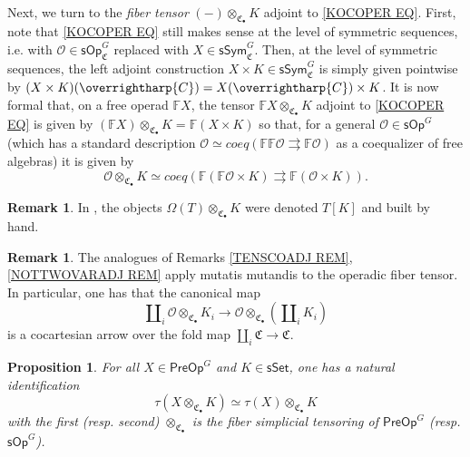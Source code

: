 \documentclass[a4paper,10pt
,draft
]{article}%
\numberwithin{equation}{section}
\numberwithin{figure}{section}
\newtheorem{proposition}[equation]{Proposition}%
\theoremstyle{definition} %
\newtheorem{remark}[equation]{Remark}%
\newcommand{\vect}[1]{\text{\overrightharp{\ensuremath{#1}}}}
\newcommand{\sSet}{\ensuremath{\mathsf{sSet}}}%
\newcommand{\sOp}{\ensuremath{\mathsf{sOp}}}%
\renewcommand{\O}{\ensuremath{\mathcal O}}
\newcommand{\1}{\ensuremath{\mathbbm 1}}%
\begin{document}
Next, we turn to the \emph{fiber tensor} 
$(-)\otimes_{\mathfrak{C}_{\bullet}} K$
adjoint to \eqref{KOCOPER EQ}.
First, note that 
\eqref{KOCOPER EQ}
still makes sense 
at the level of symmetric sequences, i.e. 
with 
$\O \in \mathsf{sOp}^G_{\mathfrak{C}}$
replaced with
$X \in \mathsf{sSym}^G_{\mathfrak{C}}$.
Then, at the level of symmetric sequences, the left adjoint construction
$X \times K \in \mathsf{sSym}^G_{\mathfrak{C}}$
is simply given pointwise by
$(X \times K)(\vect{C}) = X(\vect{C}) \times K$.
It is now formal that, 
on a free operad $\mathbb{F} X$,
the tensor $\mathbb{F} X \otimes_{\mathfrak{C}_{\bullet}} K$
adjoint to \eqref{KOCOPER EQ} is given by 
$(\mathbb{F} X) \otimes_{\mathfrak{C}_{\bullet}} K
= \mathbb{F} (X \times K)$
so that,
for a general $\O \in \mathsf{sOp}^G$
(which has a standard description
$\O \simeq coeq (\mathbb{F}\mathbb{F}\O \rightrightarrows \mathbb{F}\O)$
as a coequalizer of free algebras)
it is given by
\[
\mathcal{O} \otimes_{\mathfrak{C}_{\bullet}} K
\simeq
coeq 
\left(
\mathbb{F} (\mathbb{F} \O \times K) 
\rightrightarrows \mathbb{F} (\O \times K) 
\right).
\]
\begin{remark}\label{BYHAND2 REM}
	In \cite[\S 7.1]{CM13b}, 
	the objects $\Omega(T)  \otimes_{\mathfrak{C}_{\bullet}} K$
	were denoted $T[K]$ and built by hand.
\end{remark}


\begin{remark}
	The analogues of Remarks \ref{TENSCOADJ REM},
	\ref{NOTTWOVARADJ REM}
	apply mutatis mutandis to the operadic fiber tensor.
%	
	In particular, one has that the canonical map
\begin{equation}\label{COCARTAR EQ}
	\amalg_i \O \otimes_{\mathfrak{C}_{\bullet}} K_i
	\to
	\O \otimes_{\mathfrak{C}_{\bullet}} (\amalg_i K_i)
\end{equation}
	is a cocartesian arrow over the fold map
	$\amalg_i \mathfrak{C} \to \mathfrak{C}$.
\end{remark}



\begin{proposition}\label{TAUOTIMES_PROP}
	For all $X \in \mathsf{PreOp}^G$ and $K \in \sSet$, 
	one has a natural identification
	\[\tau(X \otimes_{\mathfrak{C}_{\bullet}} K) \simeq \tau(X) \otimes_{\mathfrak{C}_{\bullet}} K\]
	with the first (resp. second) $\otimes_{\mathfrak{C}_{\bullet}}$ is 
	the fiber simplicial tensoring of $\mathsf{PreOp}^G$ 
	(resp. $\sOp^G$).
\end{proposition}
\end{document}
